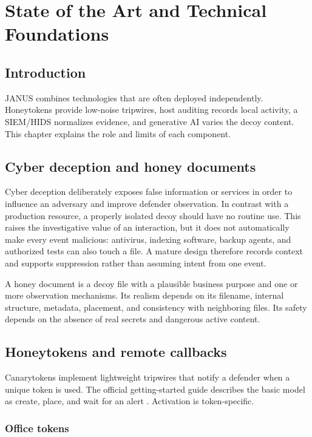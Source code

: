 \chapter{State of the Art and Technical Foundations}

\section{Introduction}

JANUS combines technologies that are often deployed independently. Honeytokens
provide low-noise tripwires, host auditing records local activity, a SIEM/HIDS
normalizes evidence, and generative AI varies the decoy content. This chapter
explains the role and limits of each component.

\section{Cyber deception and honey documents}

Cyber deception deliberately exposes false information or services in order to
influence an adversary and improve defender observation. In contrast with a
production resource, a properly isolated decoy should have no routine use. This
raises the investigative value of an interaction, but it does not automatically
make every event malicious: antivirus, indexing software, backup agents, and
authorized tests can also touch a file. A mature design therefore records
context and supports suppression rather than assuming intent from one event.

A honey document is a decoy file with a plausible business purpose and one or
more observation mechanisms. Its realism depends on its filename, internal
structure, metadata, placement, and consistency with neighboring files. Its
safety depends on the absence of real secrets and dangerous active content.

\section{Honeytokens and remote callbacks}

Canarytokens implement lightweight tripwires that notify a defender when a
unique token is used. The official getting-started guide describes the basic
model as create, place, and wait for an alert \cite{canaryGettingStarted}.
Activation is token-specific.

\subsection{Office tokens}

